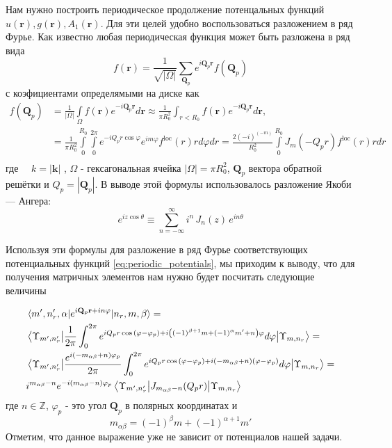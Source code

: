 \documentclass[a4paper,article,14pt]{extarticle}
\begin{document}
Нам нужно построить периодическое продолжение потенцальных функций $u(\mathbf{r}), g(\mathbf{r}), A_1(\mathbf{r})$. Для эти целей удобно воспользоваться разложением в ряд Фурье. Как известно любая периодическая функция может быть разложена в ряд вида
$$f (\mathbf{r}) = \frac{1}{\sqrt{|\Omega|}} \sum\limits_{\mathbf{Q}_p} e^{i \mathbf{Q}_p  \mathbf{r}} f(\mathbf{Q}_p) $$
с коэфициентами определямыми на диске как
\begin{equation}
\begin{aligned}
f (\mathbf{Q}_p) &= \frac{1} {|\Omega|} \int\limits_\Omega f (  \mathbf{r} ) e^{- i \mathbf{Q}_p \mathbf{r}} d \mathbf{r} \approx \frac{1}{\pi R_0^2}  \int_{r<R_{0}}  f(\mathbf{r})   e^{-i\mathbf{Q}_p  \mathbf{r}}  d \mathbf{r} , \\
&   =\frac{1}{\pi R_0^2}  \int\limits_{0}^{R_0}  \int\limits_{0}^{2 \pi} e^{-i Q_p r \cos{\varphi}} e^{i m \varphi} f^{\text{loc}}(r) r d\varphi dr =\frac{2 (-i)^{(-m)}}{R_0^2}  \int\limits_{0}^{R_0}  J_{m} (-Q_p r ) f^{\text{loc}}(r) r dr     \\
\end{aligned}
\end{equation} 
где $\quad k = \left|\mathbf{k}\right| $ ,
$\Omega$ - гексагональная ячейка $|\Omega| = \pi R_0^2$, $\mathbf{Q}_p$ вектора обратной решётки и $Q_p=|\mathbf{Q}_p|$. В выводе этой формулы использовалось разложение Якоби — Ангера:
$$
e^{i z \cos \theta} \equiv \sum_{n=-\infty}^{\infty} i^n\, J_n(z)\, e^{i n \theta}
$$

Используя эти формулы для разложение в ряд Фурье соответствующих потенциальных функций \eqref{eq:periodic_potentials}, мы приходим к выводу, что для получения матричных элементов нам нужно будет посчитать следующие величины

\begin{equation}
\label{eq:matrix_elem_k}
\begin{aligned}
&\mel{m', n'_r, \alpha} {e^{i \mathbf{Q}_p\mathbf{r} + i n \varphi} } {n_r,m, \beta} = \\ &\mel{\Upsilon_{m', n'_r}} {\frac{1}{2 \pi}\int _{0}^{ 2 \pi } e^{i Q_p r \cos{\left( \varphi - \varphi_p  \right)} + i \left((-1)^{\beta+1}m + (-1)^{\alpha} m'  + n \right)  \varphi}    d\varphi} {\Upsilon_{m, n_r}} =  \\
& \mel{\Upsilon_{m', n'_r}} {\frac{  e^{i \left(-m_{\alpha \beta}  + n \right)  \varphi_p}}{2 \pi}\int _{0}^{ 2 \pi } e^{i Q_p r \cos{\left( \varphi - \varphi_p  \right)} + i \left(-m_{\alpha \beta}  + n \right)  (\varphi-\varphi_p) }    d\varphi} {\Upsilon_{m, n_r}} =\\
& i^{m_{\alpha \beta} - n} e^{-i (m_{\alpha \beta} - n)  \varphi_p}  \mel{\Upsilon_{m', n'_r}} {J_{m_{\alpha \beta} - n } (Q_p r) }{\Upsilon_{m, n_r}}
\end{aligned}
\end{equation}
где $n \in\mathbb{Z}$, $\varphi_p$ - это угол $\mathbf{Q}_p$ в полярных координатах и 
\begin{equation}
\label{eq:m_alpha_beta}
m_{\alpha \beta} = (-1)^{\beta}m + (-1)^{\alpha+1} m'
\end{equation}
Отметим, что данное выражение уже не зависит от потенциалов нашей задачи.
\end{document}
